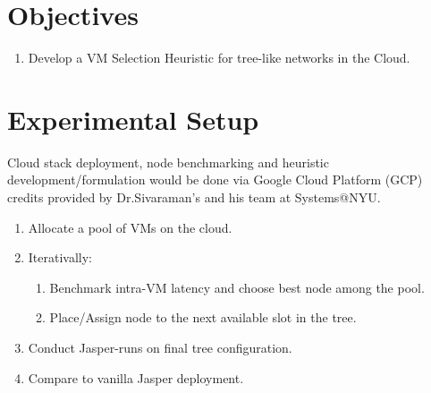 \documentclass{article}
\begin{document}
\section{Objectives}
\begin{enumerate}
    \item Develop a VM Selection Heuristic for tree-like networks in the Cloud.
\end{enumerate}

\section{Experimental Setup}
Cloud stack deployment, node benchmarking and heuristic development/formulation would be done 
via Google Cloud Platform (GCP) credits provided by Dr.Sivaraman's and his team at Systems@NYU.

\begin{enumerate}
    \item Allocate a pool of VMs on the cloud.
    \item Iterativally:
    \begin{enumerate}
        \item Benchmark intra-VM latency and choose best node among the pool.
        \item Place/Assign node to the next available slot in the tree.
    \end{enumerate}
    \item Conduct Jasper-runs on final tree configuration.
    \item Compare to vanilla Jasper deployment.
\end{enumerate}


    

 
    
\end{document}
